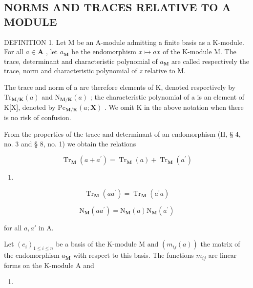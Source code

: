 \subsection{NORMS AND TRACES RELATIVE TO A MODULE}

DEFINITION 1. Let M be an A-module admitting a finite basis as a K-module. For all \(a \in \mathbf{A}\) , let \(a_{\mathbf{M}}\) be the endomorphism \(x \mapsto ax\) of the K-module M. The trace, determinant and characteristic polynomial of \(a_{\mathbf{M}}\) are called respectively the trace, norm and characteristic polynomial of \(z\) relative to M.

The trace and norm of a are therefore elements of K, denoted respectively by \(\mathrm{Tr}_{\mathbf{M}/\mathbf{K}}(a)\) and \(\mathrm{N}_{\mathbf{M}/\mathbf{K}}(a)\) ; the characteristic polynomial of a is an element of K{[}X{]}, denoted by \(\mathrm{Pc}_{\mathbf{M}/\mathbf{K}}(a;\mathbf{X})\) . We omit K in the above notation when there is no risk of confusion.

From the properties of the trace and determinant of an endomorphism (II, § 4, no. 3 and § 8, no. 1) we obtain the relations

\[
\operatorname{Tr} _ {\mathbf {M}} (a + a ^ {\prime}) = \operatorname{Tr} _ {\mathbf {M}} (a) + \operatorname{Tr} _ {\mathbf {M}} (a ^ {\prime})\tag{1}
\]

\begin{enumerate}
\def\labelenumi{(\arabic{enumi})}
\setcounter{enumi}{1}
\tightlist
\item
\end{enumerate}

\[
\operatorname{Tr} _ {\mathbf {M}} (a a ^ {\prime}) = \operatorname{Tr} _ {\mathbf {M}} (a ^ {\prime} a)\tag{3}
\]

\[
\mathrm{N} _ {\mathbf {M}} (a a ^ {\prime}) = \mathrm{N} _ {\mathbf {M}} (a) \mathrm{N} _ {\mathbf {M}} (a ^ {\prime})
\]

for all \(a, a'\) in A.

Let \((e_i)_{1\leq i\leq n}\) be a basis of the K-module M and \((m_{ij}(a))\) the matrix of the endomorphism \(a_{\mathbf{M}}\) with respect to this basis. The functions \(m_{ij}\) are linear forms on the K-module A and

\begin{enumerate}
\def\labelenumi{(\arabic{enumi})}
\setcounter{enumi}{3}
\tightlist
\item
\end{enumerate}

